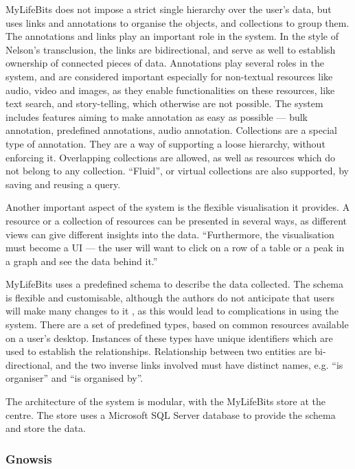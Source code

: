 MyLifeBits does not impose a strict single hierarchy over the user's data, but uses links and annotations to organise the objects, and collections to group them. The annotations and links play an important role in the system. In the style of Nelson's transclusion, the links are bidirectional, and serve as well to establish ownership of connected pieces of data. Annotations play several roles in the system, and are considered important especially for non-textual resources like audio, video and images, as they enable functionalities on these resources, like text search, and story-telling, which otherwise are not possible. The system includes features aiming to make annotation as easy as possible --- bulk annotation, predefined annotations, audio annotation. Collections are a special type of annotation. They are a way of supporting a loose hierarchy, without enforcing it. Overlapping collections are allowed, as well as resources which do not belong to any collection. ``Fluid'', or virtual collections are 
also supported, by saving and reusing a query.

Another important aspect of the system is the flexible visualisation it provides. A resource or a collection of resources can be presented in several ways, as different views can give different insights into the data. ``Furthermore, the visualisation must become a UI --- the user will want to click on a row of a table or a peak in a graph and see the data behind it.'' \cite{Gemmell2003a}

MyLifeBits uses a predefined schema \cite{Gemmell2006} to describe the data collected. The schema is flexible and customisable, although the authors do not anticipate that users will make many changes to it \cite{Gemmell2003a}, as this would lead to complications in using the system. There are a set of predefined types, based on common resources available on a user's desktop. Instances of these types have unique identifiers which are used to establish the relationships. Relationship between two entities are bi-directional, and the two inverse links involved must have distinct names, e.g. ``is organiser'' and ``is organised by''.

The architecture of the system is modular, with the MyLifeBits store at the centre. The store \cite{Gemmell2003a} uses a Microsoft SQL Server database to provide the schema and store the data. 

\subsubsection{Gnowsis}

